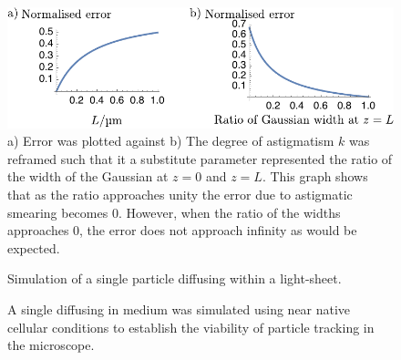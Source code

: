 

\begin{figure}
  \centering
  \includegraphics{./mathematica/area_analysis}
  \caption{
  a) Error was plotted against %
  b) The degree of astigmatism $k$ was reframed such that it a substitute parameter represented the ratio of the width of the Gaussian at $z=0$ and $z=L$.
  This graph shows that as the ratio approaches unity the error due to astigmatic smearing becomes $0$.
  However, when the ratio of the widths approaches 0, the error does not approach infinity as would be expected.
  }
  \label{fig:area_analysis}
\end{figure}
%

\begin{figure}
  \centering
  \caption{Simulation of a single particle diffusing within a light-sheet.}
  \label{fig:diffusion_3d}
\end{figure}



\begin{figure}
  \centering
  \caption{A single diffusing in medium was simulated using near native cellular conditions to establish the viability of particle tracking in the microscope.}
  \label{}
\end{figure}

